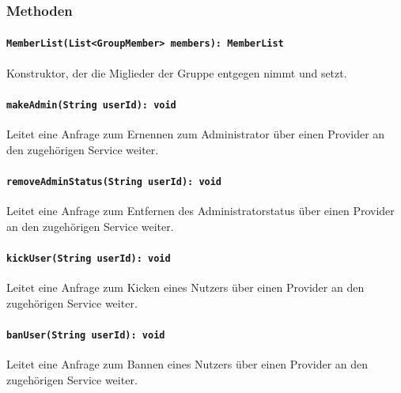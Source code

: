 \documentclass{entwurfsheft}
\begin{document}
\begin{sloppypar}
\subsubsection*{Methoden}
\paragraph{\texttt{MemberList(List<GroupMember> members): MemberList}}
Konstruktor, der die Miglieder der Gruppe entgegen nimmt und setzt.
\paragraph{\texttt{makeAdmin(String userId): void}}
Leitet eine Anfrage zum Ernennen zum Administrator über einen Provider an den zugehörigen Service weiter.
\paragraph{\texttt{removeAdminStatus(String userId): void}}
Leitet eine Anfrage zum Entfernen des Administratorstatus über einen Provider an den zugehörigen Service weiter.
\paragraph{\texttt{kickUser(String userId): void}}
Leitet eine Anfrage zum Kicken eines Nutzers über einen Provider an den zugehörigen Service weiter.
\paragraph{\texttt{banUser(String userId): void}}
Leitet eine Anfrage zum Bannen eines Nutzers über einen Provider an den zugehörigen Service weiter.
\newpage

\end{sloppypar}
\end{document}

